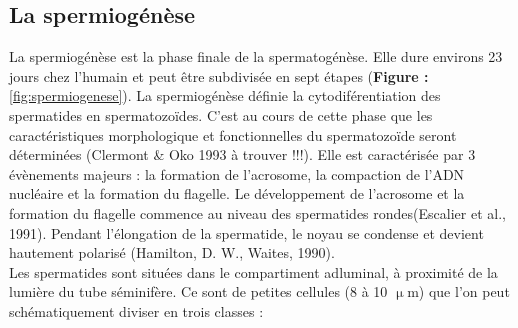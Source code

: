 \documentclass[12pt,twoside]{reedthesis}
\theoremstyle{definition}
\theoremstyle{definition}
\theoremstyle{remark}
\begin{document}
  \subsection{La spermiogénèse}\label{la-spermiogenese}
  
  La spermiogénèse est la phase finale de la spermatogénèse. Elle dure
  environs 23 jours chez l'humain et peut être subdivisée en sept étapes
  (\textbf{Figure : }\ref{fig:spermiogenese}). La spermiogénèse définie la
  cytodiférentiation des spermatides en spermatozoïdes. C'est au cours de
  cette phase que les caractéristiques morphologique et fonctionnelles du
  spermatozoïde seront déterminées (Clermont \& Oko 1993 à trouver !!!).
  Elle est caractérisée par 3 évènements majeurs : la formation de
  l'acrosome, la compaction de l'ADN nucléaire et la formation du
  flagelle. Le développement de l'acrosome et la formation du flagelle
  commence au niveau des spermatides rondes(Escalier et al., 1991).
  Pendant l'élongation de la spermatide, le noyau se condense et devient
  hautement polarisé (Hamilton, D. W., Waites, 1990).\\
  Les spermatides sont situées dans le compartiment adluminal, à proximité
  de la lumière du tube séminifère. Ce sont de petites cellules (8 à 10
  \(\upmu\)m) que l'on peut schématiquement diviser en trois classes :
  
\end{document}
